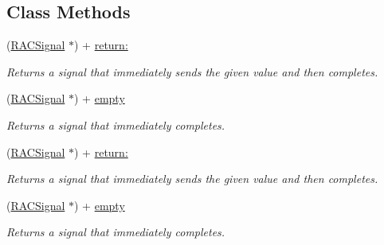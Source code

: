 \subsection*{Class Methods}
\begin{DoxyCompactItemize}
\item 
\mbox{\label{category_r_a_c_signal_07_r_a_c_stream_08_a41b2f3cea45bb3a14911299cb572b7d9}} 
(\mbox{\hyperlink{interface_r_a_c_signal}{R\+A\+C\+Signal}} $\ast$) + \mbox{\hyperlink{category_r_a_c_signal_07_r_a_c_stream_08_a41b2f3cea45bb3a14911299cb572b7d9}{return\+:}}
\begin{DoxyCompactList}\small\item\em Returns a signal that immediately sends the given value and then completes. \end{DoxyCompactList}\item 
\mbox{\label{category_r_a_c_signal_07_r_a_c_stream_08_a7905f73a3de844e28a19d9d63cd37214}} 
(\mbox{\hyperlink{interface_r_a_c_signal}{R\+A\+C\+Signal}} $\ast$) + \mbox{\hyperlink{category_r_a_c_signal_07_r_a_c_stream_08_a7905f73a3de844e28a19d9d63cd37214}{empty}}
\begin{DoxyCompactList}\small\item\em Returns a signal that immediately completes. \end{DoxyCompactList}\item 
\mbox{\label{category_r_a_c_signal_07_r_a_c_stream_08_a41b2f3cea45bb3a14911299cb572b7d9}} 
(\mbox{\hyperlink{interface_r_a_c_signal}{R\+A\+C\+Signal}} $\ast$) + \mbox{\hyperlink{category_r_a_c_signal_07_r_a_c_stream_08_a41b2f3cea45bb3a14911299cb572b7d9}{return\+:}}
\begin{DoxyCompactList}\small\item\em Returns a signal that immediately sends the given value and then completes. \end{DoxyCompactList}\item 
\mbox{\label{category_r_a_c_signal_07_r_a_c_stream_08_a7905f73a3de844e28a19d9d63cd37214}} 
(\mbox{\hyperlink{interface_r_a_c_signal}{R\+A\+C\+Signal}} $\ast$) + \mbox{\hyperlink{category_r_a_c_signal_07_r_a_c_stream_08_a7905f73a3de844e28a19d9d63cd37214}{empty}}
\begin{DoxyCompactList}\small\item\em Returns a signal that immediately completes. \end{DoxyCompactList}\item 

\end{DoxyCompactItemize}

